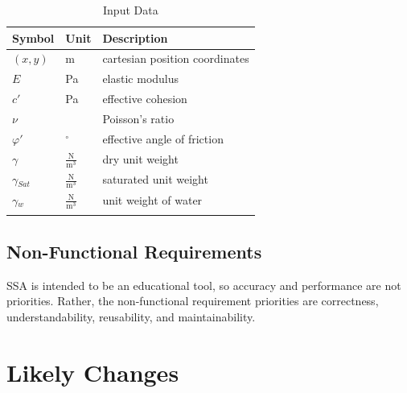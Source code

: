 \documentclass[12pt]{article}
\begin{document}
\begin{longtable}{l l l}
\toprule
Symbol & Unit & Description
\\
\midrule
$(x,y)$ & m & cartesian position coordinates
\\
$E$ & Pa & elastic modulus
\\
$c'$ & Pa & effective cohesion
\\
$\nu{}$ &  & Poisson's ratio
\\
$\varphi{}'$ & ${}^{\circ}$ & effective angle of friction
\\
$\gamma{}$ & $\frac{\text{N}}{\text{m}^{3}}$ & dry unit weight
\\
$\gamma{}_{Sat}$ & $\frac{\text{N}}{\text{m}^{3}}$ & saturated unit weight
\\
$\gamma{}_{w}$ & $\frac{\text{N}}{\text{m}^{3}}$ & unit weight of water
\\
\bottomrule
\caption{Input Data}
\label{Table:InpuData}
\end{longtable}
\subsection{Non-Functional Requirements}
\label{Sec:Non-Requ}
SSA is intended to be an educational tool, so accuracy and performance are not priorities. Rather, the non-functional requirement priorities are correctness, understandability, reusability, and maintainability.
\section{Likely Changes}
\label{Sec:LikeChan}
\end{document}
